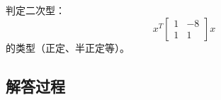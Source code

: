 \begin{example}[二次型分类]
    判定二次型：
    \[
    x^T \begin{bmatrix} 1 & -8 \\ 1 & 1 \end{bmatrix} x
    \]
    的类型（正定、半正定等）。
    \end{example}
    
    \subsection*{解答过程}
    